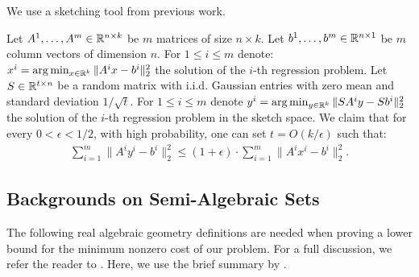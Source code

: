 We use a sketching tool from previous work.
\begin{lemma}
Let $A^1, \ldots, A^m \in \mathbb{R}^{n \times k}$ be $m$ matrices of size $n \times k$. Let $b^1, \ldots, b^m \in \mathbb{R}^{n \times 1}$ be $m$ column vectors of dimension $n$. For $1 \leq i \leq m$ denote: $x^i= \arg\min_{ x \in \mathbb{R}^{k} } \|A^i x-b^i \|_2^2$ the solution of the $i$-th regression problem. Let $S \in \mathbb{R}^{t \times n}$ be a random matrix with i.i.d. Gaussian entries with zero mean and standard deviation $1 / \sqrt{t}$. For $1 \leq i \leq m$ denote $ y^i= \arg\min_{y \in \mathbb{R}^{k}} \|S A^i y-S b^i \|_2^2 $  the solution of the $i$-th regression problem in the sketch space. We claim that for every $0<\epsilon<1 / 2$, with high probability, one can set $t=O(k / \epsilon)$ such that: 
\begin{align*}
\sum_{i=1}^m \|A^i y^i-b^i \|_2^2 \leq(1+\epsilon) \cdot \sum_{i=1}^m \|A^i x^i-b^i \|_2^2.
\end{align*}
\end{lemma}


\subsection{Backgrounds on Semi-Algebraic Sets}\label{sec:preli_app}


The following real algebraic geometry definitions are needed when proving a lower bound for the minimum nonzero cost of our problem. For a full discussion, we refer the reader to \cite{bcr87}. Here, we use the brief summary by \cite{bpr5}.


